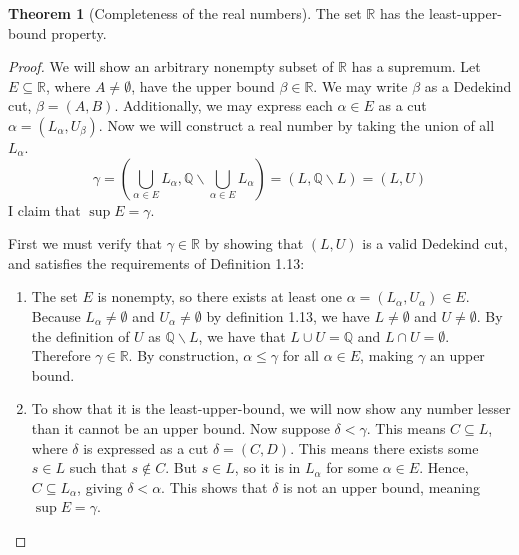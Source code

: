 \documentclass{article}
\newcommand{\R}{\mathbb{R}}
\newcommand{\Q}{\mathbb{Q}}
\theoremstyle{definition}
\newtheorem{theorem}{Theorem}[section]
\begin{document}
	\begin{theorem}[Completeness of the real numbers]
		The set $ \R $ has the least-upper-bound property.
		\begin{proof}
			We will show an arbitrary nonempty subset of $ \R $ has a supremum. Let $ E\subseteq \R $, where $ A\neq\emptyset $, have the upper bound $ \beta\in\R $. We may write $ \beta $ as a Dedekind cut, $ \beta=(A,B) $. Additionally, we may express each $ \alpha\in E $ as a cut $ \alpha=(L_\alpha,U_\beta) $. Now we will construct a real number by taking the union of all $ L_\alpha $.
			$$ \gamma=\left(\bigcup_{\alpha\in E}L_\alpha,\Q\backslash \bigcup_{\alpha\in E}L_\alpha\right)=(L,\Q\backslash
			L)=(L,U)$$  
			I claim that $ \sup E=\gamma $.
			
			First we must verify that $ \gamma\in\R $ by showing that $ (L,U) $ is a valid Dedekind cut, and satisfies the requirements of Definition 1.13: 
			\begin{enumerate}
				\item The set $ E $ is nonempty, so there exists at least one $ \alpha=(L_\alpha,U_\alpha)\in E $. Because $ L_\alpha\neq\emptyset $ and $ U_\alpha\neq\emptyset $ by definition 1.13, we have $ L\neq\emptyset $ and $ U\neq\emptyset $. By the definition of $ U $ as $ \Q\backslash L $, we have that $  L\cup U=\Q$ and $ L\cap U=\emptyset $. Therefore $ \gamma\in\R $. By construction, $ \alpha\le\gamma $ for all $ \alpha\in E $, making $ \gamma $ an upper bound. 
				\item To show that it is the least-upper-bound, we will now show any number lesser than it cannot be an upper bound. Now suppose $ \delta <\gamma $. This means $  C\subseteq L $, where $ \delta $ is expressed as a cut $ \delta=(C,D) $. This means there exists some $ s\in L $ such that $ s\notin C $. But $ s\in L $, so it is in $ L_\alpha $ for some $ \alpha\in E $. Hence, $ C\subseteq L_\alpha $, giving $ \delta <\alpha $. This shows that $ \delta $ is not an upper bound, meaning $ \sup E =\gamma$.
			\end{enumerate}
		\end{proof}
	\end{theorem}
	
\end{document}
